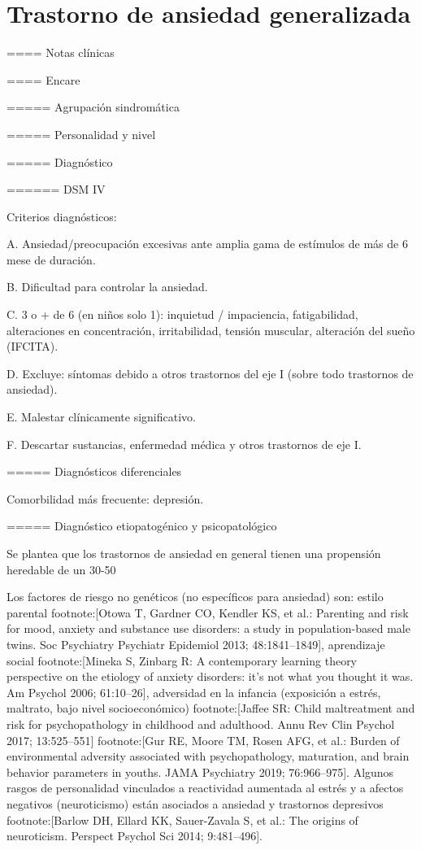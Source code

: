\chapter{Trastorno de ansiedad generalizada}

==== Notas clínicas

==== Encare

===== Agrupación sindromática

===== Personalidad y nivel

===== Diagnóstico

====== DSM IV

Criterios diagnósticos:

A. Ansiedad/preocupación excesivas ante amplia gama de estímulos de más de 6 mese de duración.

B. Dificultad para controlar la ansiedad.

C. 3 o + de 6 (en niños solo 1): inquietud / impaciencia, fatigabilidad, alteraciones en concentración, irritabilidad, tensión muscular, alteración del sueño (IFCITA).

D. Excluye: síntomas debido a otros trastornos del eje I (sobre todo trastornos de ansiedad).

E. Malestar clínicamente significativo.

F. Descartar sustancias, enfermedad médica y otros trastornos de eje I.

===== Diagnósticos diferenciales

Comorbilidad más frecuente: depresión.

===== Diagnóstico etiopatogénico y psicopatológico

Se plantea que los trastornos de ansiedad en general tienen una propensión heredable de un 30-50%

Los factores de riesgo no genéticos (no específicos para ansiedad) son: estilo parental footnote:[Otowa T, Gardner CO, Kendler KS, et al.: Parenting and risk for mood, anxiety and substance use disorders: a study in population-based male twins. Soc Psychiatry Psychiatr Epidemiol 2013; 48:1841–1849], aprendizaje social footnote:[Mineka S, Zinbarg R: A contemporary learning theory perspective on the etiology of anxiety disorders: it’s not what you thought it was. Am Psychol 2006; 61:10–26], adversidad en la infancia (exposición a estrés, maltrato, bajo nivel socioeconómico) footnote:[Jaffee SR: Child maltreatment and risk for psychopathology in childhood and adulthood. Annu Rev Clin Psychol 2017; 13:525–551] footnote:[Gur RE, Moore TM, Rosen AFG, et al.: Burden of environmental adversity associated with psychopathology, maturation, and brain behavior parameters in youths. JAMA Psychiatry 2019; 76:966–975]. Algunos rasgos de personalidad vinculados a reactividad aumentada al estrés y a afectos negativos (neuroticismo) están asociados a ansiedad y trastornos depresivos footnote:[Barlow DH, Ellard KK, Sauer-Zavala S, et al.: The origins of neuroticism. Perspect Psychol Sci 2014; 9:481–496].

